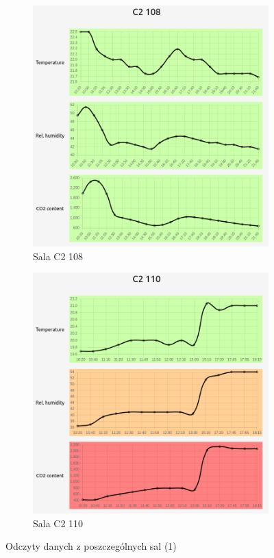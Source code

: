 \begin{figure}[H]
    \begin{subfigure}{0.5\textwidth}
        \centering
        \includegraphics[width=\linewidth]{zdj/app/readings-c2108.png}
        \caption{Sala C2 108}
        \label{c2-108}
    \end{subfigure}
    \begin{subfigure}{0.5\textwidth}
        \centering
        \includegraphics[width=\linewidth]{zdj/app/readings-c2110.png}
        \caption{Sala C2 110}
        \label{c2-110}
    \end{subfigure}
\caption{Odczyty danych z poszczególnych sal (1)}
\end{figure}
